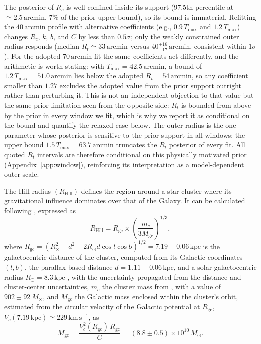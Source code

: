 \documentclass{aa}
\begin{document}
The posterior of $R_c$ is well confined inside its support (97.5th percentile at $\simeq2.5\,\mathrm{arcmin}$, $7\%$ of the prior upper bound), so its bound is immaterial. Refitting the $40\,\mathrm{arcmin}$ profile with alternative coefficients (e.g., $0.9\,T_{\mathrm{max}}$ and $1.2\,T_{\mathrm{max}}$) changes $R_c$, $k$, $b$, and $C$ by less than $0.5\sigma$; only the weakly constrained outer radius responds (median $R_t\simeq33\,\mathrm{arcmin}$ versus $40^{+16}_{-17}\,\mathrm{arcmin}$, consistent within $1\sigma$). For the adopted $70\,\mathrm{arcmin}$ fit the same coefficients act differently, and the arithmetic is worth stating: with $T_{\mathrm{max}}=42.5\,\mathrm{arcmin}$, a bound of $1.2\,T_{\mathrm{max}}=51.0\,\mathrm{arcmin}$ lies below the adopted $R_t=54\,\mathrm{arcmin}$, so any coefficient smaller than $1.27$ excludes the adopted value from the prior support outright rather than perturbing it. This is not an independent objection to that value but the same prior limitation seen from the opposite side: $R_t$ is bounded from above by the prior in every window we fit, which is why we report it as conditional on the bound and quantify the relaxed case below. The outer radius is the one parameter whose posterior is sensitive to the prior support in all windows: the upper bound $1.5\,T_{\mathrm{max}}=63.7\,\mathrm{arcmin}$ truncates the $R_t$ posterior of every fit. All quoted $R_t$ intervals are therefore conditional on this physically motivated prior (Appendix~\ref{app:window}), reinforcing its interpretation as a model-dependent outer scale.

The Hill radius $(R_\mathrm{Hill})$ defines the region around a star cluster where its gravitational influence dominates over that of the Galaxy. It can be calculated following \citet{2019A&A...627A.119C}, expressed as
\begin{equation}
R_\mathrm{Hill} = R_{\mathrm{gc}} \times \left(\frac{m_c}{3M_{\mathrm{gc}}}\right)^{1/3},
\end{equation}
where $R_{\mathrm{gc}} = \left(R_\odot^{2} + d^{2} - 2 R_\odot d \cos l \cos b\right)^{1/2} = 7.19 \pm 0.06\,\mathrm{kpc}$ is the galactocentric distance of the cluster, computed from its Galactic coordinates $(l,b)$, the parallax-based distance $d = 1.11 \pm 0.06\,\mathrm{kpc}$, and a solar galactocentric radius $R_\odot = 8.3\,\mathrm{kpc}$ \citep{2016ApJS..227....5D}, with the uncertainty propagated from the distance and cluster-center uncertainties, $ m_c $ the cluster mass from \citet{2024arXiv240305143H}, with a value of $902 \pm 92~M_\odot$, and $ M_{\mathrm{gc}} $ the Galactic mass enclosed within the cluster's orbit, estimated from the circular velocity of the \citet{2017MNRAS.465...76M} Galactic potential at $R_{\mathrm{gc}}$, $V_c(7.19\,\mathrm{kpc}) \simeq 229\,\mathrm{km\,s^{-1}}$, as
\begin{equation}
	M_{\mathrm{gc}} = \frac{V_c^2(R_{\mathrm{gc}})\, R_{\mathrm{gc}}}{G} = (8.8 \pm 0.5) \times 10^{10}\,M_\odot.
\end{equation}
\end{document}
